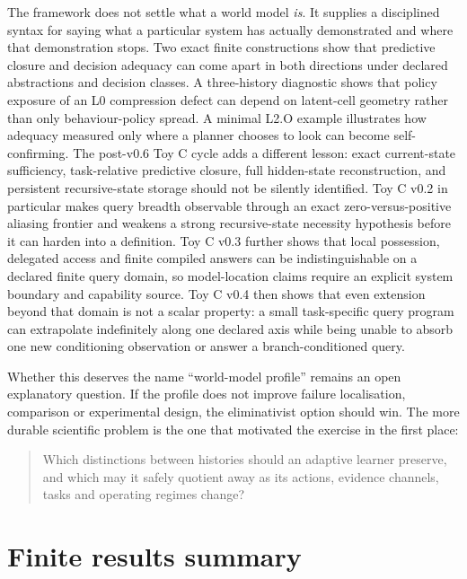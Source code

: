 \documentclass[10pt]{article}
\begin{document}
The framework does not settle what a world model \emph{is}. It supplies a disciplined syntax for saying what a particular system has actually demonstrated and where that demonstration stops. Two exact finite constructions show that predictive closure and decision adequacy can come apart in both directions under declared abstractions and decision classes. A three-history diagnostic shows that policy exposure of an L0 compression defect can depend on latent-cell geometry rather than only behaviour-policy spread. A minimal L2.O example illustrates how adequacy measured only where a planner chooses to look can become self-confirming. The post-v0.6 Toy C cycle adds a different lesson: exact current-state sufficiency, task-relative predictive closure, full hidden-state reconstruction, and persistent recursive-state storage should not be silently identified. Toy C v0.2 in particular makes query breadth observable through an exact zero-versus-positive aliasing frontier and weakens a strong recursive-state necessity hypothesis before it can harden into a definition. Toy C v0.3 further shows that local possession, delegated access and finite compiled answers can be indistinguishable on a declared finite query domain, so model-location claims require an explicit system boundary and capability source. Toy C v0.4 then shows that even extension beyond that domain is not a scalar property: a small task-specific query program can extrapolate indefinitely along one declared axis while being unable to absorb one new conditioning observation or answer a branch-conditioned query.

Whether this deserves the name ``world-model profile'' remains an open explanatory question. If the profile does not improve failure localisation, comparison or experimental design, the eliminativist option should win. The more durable scientific problem is the one that motivated the exercise in the first place:
\begin{quote}
Which distinctions between histories should an adaptive learner preserve, and which may it safely quotient away as its actions, evidence channels, tasks and operating regimes change?
\end{quote}

\clearpage
\appendix
\section{Finite results summary}
\end{document}

